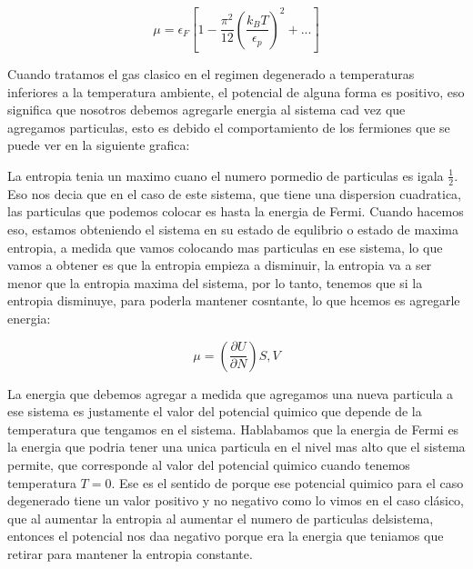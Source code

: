 \documentclass[11pt,fleqn]{book}
\begin{document}


\begin{equation}
    \mu=\epsilon_{F}\left[1-\frac{\pi^{2}}{12}\left(\frac{k_{B}T}{\epsilon_{p}}\right)^{2}+...\right]
\end{equation}



Cuando tratamos el gas clasico en el regimen degenerado a temperaturas inferiores a la temperatura ambiente, el potencial de alguna forma es positivo, eso significa que nosotros debemos agregarle energia al sistema cad vez que agregamos particulas, esto es debido  el comportamiento de los fermiones que se puede ver en la siguiente grafica:


La entropia tenia un maximo cuano el numero pormedio de particulas es igala $\frac{1}{2}$. Eso nos decia que en el caso de este sistema, que tiene una dispersion cuadratica, las particulas que podemos colocar es hasta la energia de Fermi. Cuando hacemos eso, estamos obteniendo el sistema en su estado de equlibrio o estado de maxima entropia, a medida que vamos colocando mas particulas en ese sistema, lo que vamos a obtener es que la entropia empieza a disminuir, la entropia va a ser menor que la entropia maxima del sistema, por lo tanto, tenemos que si la entropia disminuye, para poderla mantener cosntante, lo que hcemos es agregarle energia:

\begin{equation}
    \mu=\left(\frac{\partial U}{\partial N}\right)S,V
\end{equation}


La energia que debemos agregar a medida que agregamos una  nueva particula a ese sistema es justamente el valor del potencial quimico que depende de la temperatura que tengamos en el sistema. Hablabamos que la energia de Fermi es la energia que podria tener una unica particula en el nivel mas alto que el sistema permite, que corresponde al valor del potencial quimico cuando tenemos temperatura $T=0$. Ese es el sentido de porque ese potencial quimico para el caso degenerado tiene un valor positivo y no negativo como lo vimos en el caso clásico, que al aumentar la entropia al aumentar el numero de particulas delsistema, entonces el potencial nos daa negativo porque era la energia que teniamos que retirar para mantener la entropia constante.\\
\end{document}
